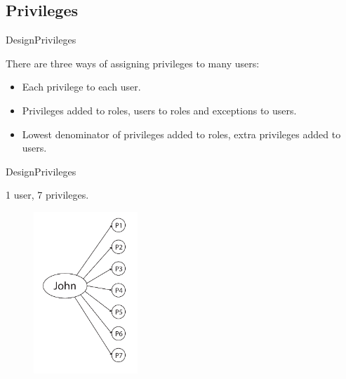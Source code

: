 \subsection{Privileges}
\begin{frame}{Design}{Privileges}
  \begin{block}{}
  	There are three ways of assigning privileges to many users:

  	\begin{itemize}
  		\item Each privilege to each user.
  		\item Privileges added to roles, users to roles and exceptions to users.
  		\item Lowest denominator of privileges added to roles, extra privileges added to users.
  	\end{itemize}

  \end{block}
\end{frame}

\begin{frame}{Design}{Privileges}
  \begin{block}{}
  	1 user, 7 privileges.

  	\begin{figure}[htb]
    	\centering
    	\includegraphics[width=0.35\textwidth]{images/privileges1.pdf}
  	\end{figure}
  \end{block}
\end{frame}

